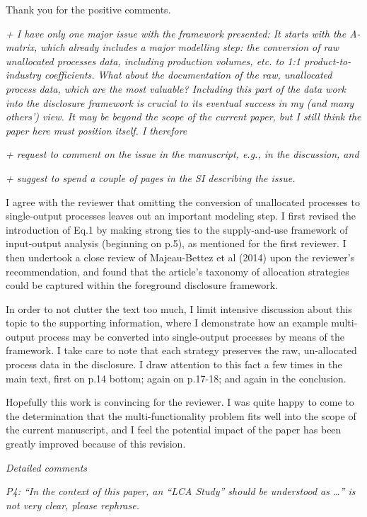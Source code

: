 \documentclass[11pt,letterpaper]{article}
\begin{document}
Thank you for the positive comments.

\emph{+ I have only one major issue with the framework presented: It starts with the A-matrix, which already includes a major modelling step: the conversion of raw unallocated processes data, including production volumes, etc. to 1:1 product-to-industry coefficients. What about the documentation of the raw, unallocated process data, which are the most valuable?
  Including this part of the data work into the disclosure framework is crucial to its eventual success in my (and many others’) view. It may be beyond the scope of the current paper, but I still think the paper here must position itself. I therefore}

\emph{+ request to comment on the issue in the manuscript, e.g., in the discussion, and}

\emph{+ suggest to spend a couple of pages in the SI describing the issue.}

I agree with the reviewer that omitting the conversion of unallocated processes to single-output processes leaves out an important modeling step.  I first revised the introduction of Eq.1 by making strong ties to the supply-and-use framework of input-output analysis (beginning on p.5), as mentioned for the first reviewer.  I then undertook a close review of Majeau-Bettez et al (2014) upon the reviewer's recommendation, and found that the article's taxonomy of allocation strategies could be captured within the foreground disclosure framework.  

In order to not clutter the text too much, I limit intensive discussion about this topic to the supporting information, where I demonstrate how an example multi-output process may be converted into single-output processes by means of the framework.  I take care to note that each strategy preserves the raw, un-allocated process data in the disclosure.  I draw attention to this fact a few times in the main text, first on p.14 bottom; again on p.17-18; and again in the conclusion.

Hopefully this work is convincing for the reviewer. I was quite happy to come to the determination that the multi-functionality problem fits well into the scope of the current manuscript, and I feel the potential impact of the paper has been greatly improved because of this revision.

\emph{Detailed comments}

\emph{P4: “In the context of this paper, an “LCA Study” should be understood as …” is not very clear, please rephrase.}
\end{document}
